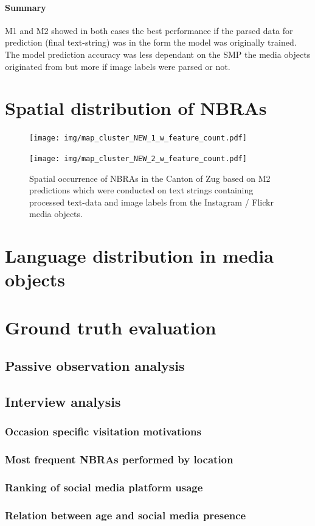 \paragraph{Summary}
M1 and M2 showed in both cases the best performance if the parsed data for prediction (final text-string) was in the form the model was originally trained.
The model prediction accuracy was less dependant on the SMP the media objects originated from but more if image labels were parsed or not.

\section{Spatial distribution of NBRAs}

\begin{figure}[ht]
   \centering
   \texttt{[image: img/map\_cluster\_NEW\_1\_w\_feature\_count.pdf]}
   \label{fig:map_cluster_1}
\end{figure}

\begin{figure}[ht]
   \centering
   \texttt{[image: img/map\_cluster\_NEW\_2\_w\_feature\_count.pdf]}
   \caption{Spatial occurrence of NBRAs in the Canton of Zug based on M2 predictions which were conducted on text strings containing processed text-data and image labels from the Instagram / Flickr media objects.}
   \label{fig:map_cluster_2}
\end{figure}

\section{Language distribution in media objects}


\section{Ground truth evaluation}

\subsection{Passive observation analysis}

\subsection{Interview analysis}
\subsubsection{Occasion specific visitation motivations}

\subsubsection{Most frequent NBRAs performed by location}

\subsubsection{Ranking of social media platform usage}

\subsubsection{Relation between age and social media presence}



